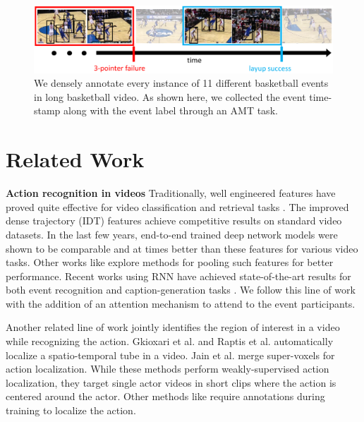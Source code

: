 
\begin{figure}[ht!]
  \includegraphics[width=6.5 in]{images/dataset_figure_cropped.pdf}
  \caption{We densely annotate every instance of 11 different basketball events in long basketball
  video. As shown here, we collected the event time-stamp along with the event label through an
AMT task.}
\end{figure}



\section{Related Work}

\noindent \textbf{Action recognition in videos}
Traditionally, well engineered features have proved quite effective for video
classification and retrieval tasks
\cite{Dalal_ECCV06,Jain_CVPR13,Jiang_ECCV12,Laptev_CVPR08,
Niebels_ECCV10,Oh_MVA14,Oneata_ICCV13,Peng_ECCV14,Sadanand_CVPR12,Schuldt_ICPR04,Wang_BMVC09,Wang_CVPR11}.
The improved dense trajectory (IDT) features \cite{Wang_CVPR11} achieve
competitive results on standard video datasets.  In the last few years,
end-to-end trained deep network models
\cite{Ji_PAMI13,Karpathy_CVPR14,Simonyan_2014,Simonyan_NIPS14,Tran_arxiv14} were shown to be comparable and
at times better than these features for various video tasks.  Other works like
\cite{Wang_arxiv15,Xu_2015,Zha_2015} explore methods for pooling such
features for better performance. Recent works using RNN have achieved
state-of-the-art results for both event recognition and caption-generation
tasks \cite{Donahue_arxiv14,Ng_arxiv15,Srivastava_2015,Yao_arxiv15}.
We follow this line of work with the addition of an attention mechanism
to attend to the event participants.

Another related line of work jointly identifies the region of interest in a video
while recognizing the action.
Gkioxari et al.  \cite{Gkioxari_arxiv14} and Raptis et al.  \cite{Raptis_CVPR12}
automatically localize a spatio-temporal tube in a video.
Jain et al. \cite{Jain_CVPR14} merge super-voxels for action localization.
While these methods perform weakly-supervised action localization, they target
single actor videos in short clips where the action is centered around the actor.
Other methods like \cite{Lan_ICCV11,Prest_PAMI13,Tian_CVPR13,Wang_ECCV14} require annotations
during training to localize the action.

